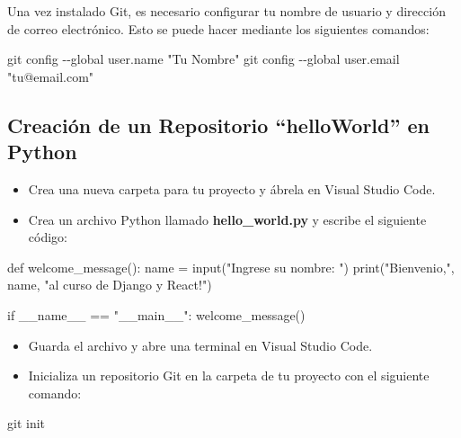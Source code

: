 \documentclass[
  a4paper,
  DIV=11,
  numbers=noendperiod,
  onepage,
  openany]{scrreprt}
\newenvironment{Shaded}{\begin{snugshade}}{\end{snugshade}}
\newcommand{\AttributeTok}[1]{\textcolor[rgb]{0.40,0.45,0.13}{#1}}
\newcommand{\BuiltInTok}[1]{\textcolor[rgb]{0.00,0.23,0.31}{#1}}
\newcommand{\ControlFlowTok}[1]{\textcolor[rgb]{0.00,0.23,0.31}{#1}}
\newcommand{\FunctionTok}[1]{\textcolor[rgb]{0.28,0.35,0.67}{#1}}
\newcommand{\KeywordTok}[1]{\textcolor[rgb]{0.00,0.23,0.31}{#1}}
\newcommand{\NormalTok}[1]{\textcolor[rgb]{0.00,0.23,0.31}{#1}}
\newcommand{\OperatorTok}[1]{\textcolor[rgb]{0.37,0.37,0.37}{#1}}
\newcommand{\StringTok}[1]{\textcolor[rgb]{0.13,0.47,0.30}{#1}}
\newcommand{\VariableTok}[1]{\textcolor[rgb]{0.07,0.07,0.07}{#1}}
\providecommand{\tightlist}{%
  \setlength{\itemsep}{0pt}\setlength{\parskip}{0pt}}\usepackage{longtable,booktabs,array}
\begin{document}
Una vez instalado Git, es necesario configurar tu nombre de usuario y
dirección de correo electrónico. Esto se puede hacer mediante los
siguientes comandos:

\begin{Shaded}
\begin{Highlighting}[]
\FunctionTok{git}\NormalTok{ config }\AttributeTok{{-}{-}global}\NormalTok{ user.name }\StringTok{"Tu Nombre"}
\FunctionTok{git}\NormalTok{ config }\AttributeTok{{-}{-}global}\NormalTok{ user.email }\StringTok{"tu@email.com"}
\end{Highlighting}
\end{Shaded}

\subsection{Creación de un Repositorio ``helloWorld'' en Python
🐍}\label{creaciuxf3n-de-un-repositorio-helloworld-en-python}

\begin{itemize}
\tightlist
\item
  Crea una nueva carpeta para tu proyecto y ábrela en Visual Studio
  Code.
\item
  Crea un archivo Python llamado \textbf{hello\_world.py} y escribe el
  siguiente código:
\end{itemize}

\begin{Shaded}
\begin{Highlighting}[]
\KeywordTok{def}\NormalTok{ welcome\_message():}
\NormalTok{    name }\OperatorTok{=} \BuiltInTok{input}\NormalTok{(}\StringTok{"Ingrese su nombre: "}\NormalTok{)}
    \BuiltInTok{print}\NormalTok{(}\StringTok{"Bienvenio,"}\NormalTok{, name, }\StringTok{"al curso de Django y React!"}\NormalTok{)}

\ControlFlowTok{if} \VariableTok{\_\_name\_\_} \OperatorTok{==} \StringTok{"\_\_main\_\_"}\NormalTok{:}
\NormalTok{    welcome\_message()}
\end{Highlighting}
\end{Shaded}

\begin{itemize}
\tightlist
\item
  Guarda el archivo y abre una terminal en Visual Studio Code.
\item
  Inicializa un repositorio Git en la carpeta de tu proyecto con el
  siguiente comando:
\end{itemize}

\begin{Shaded}
\begin{Highlighting}[]
\FunctionTok{git}\NormalTok{ init}
\end{Highlighting}
\end{Shaded}
\end{document}

